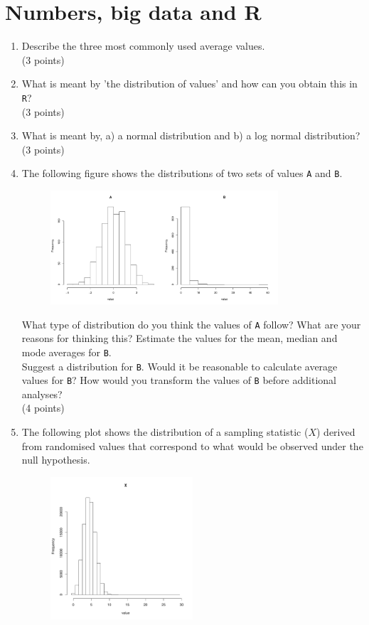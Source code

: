 \documentclass[11pt]{article}
\begin{document}
\section{Numbers, big data and R}
\begin{enumerate}
\item Describe the three most commonly used average values.\\
  (3 points)
\item What is meant by 'the distribution of values' and how can you obtain
  this in \texttt{R}?\\
  (3 points)
\item What is meant by, a) a normal distribution and b) a log normal
  distribution?\\
  (3 points)
\item The following figure shows the distributions of two sets of values \texttt{A}
  and \texttt{B}.
  \begin{figure}[H]
    \includegraphics[width=0.8\textwidth]{R/log_norm.pdf}
  \end{figure}
  What type of distribution do you think the values of \texttt{A} follow? What are your
  reasons for thinking this? Estimate the values for the mean, median and mode
  averages for \texttt{B}.\\
  Suggest a distribution for \texttt{B}. Would it be reasonable to calculate
  average values for \texttt{B}? How would you transform the values of
  \texttt{B} before additional analyses?\\
  (4 points)
\item The following plot shows the distribution of a sampling statistic ($X$)
  derived from randomised values that correspond to what would be observed
  under the null hypothesis. 
  \begin{figure}[H]
    \includegraphics[width=0.5\textwidth]{R/hyper}

\end{figure}
\end{enumerate}
\end{document}
